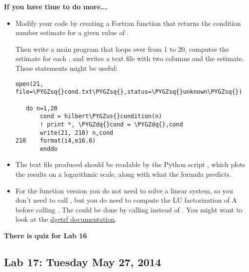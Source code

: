 \documentclass[letterpaper,10pt,english]{sphinxmanual}
\def\PYGZus{\char`\_}
\def\PYGZsq{\char`\'}
\def\PYGZdq{\char`\"}
\renewcommand\PYGZsq{\textquotesingle}
\begin{document}
\textbf{If you have time to do more...}
\begin{itemize}
\item {} 
Modify your code by creating a Fortran function  that returns the condition number
estimate for a given value of .

Then write a main program that loops over  from 1 to 20, computes the estimate for each ,
and writes a text file with two columns  and the estimate.  These statements might be
useful:

\begin{Verbatim}[commandchars=\\\{\}]
   open(21, file=\PYGZsq{}cond.txt\PYGZsq{},status=\PYGZsq{}unknown\PYGZsq{})

   do n=1,20
       cond = hilbert\PYGZus{}condition(n)
       ! print *, \PYGZdq{}cond = \PYGZdq{},cond
       write(21, 210) n,cond
210    format(i4,e16.6)
       enddo
\end{Verbatim}

\item {} 
The text file produced should be readable by the Python script
, which plots the results on a logarithmic scale, along with
what the formula predicts.

\item {} 
For the function version you do not need to solve a linear system, so you don't need to call
, but you do need to compute the LU factorization of A before calling .
The could be done by calling  instead of .
You might want to look at the \href{http://www.netlib.no/netlib/lapack/double/dgetrf.f}{dgetrf documentation}.

\end{itemize}

\textbf{There is quiz for Lab 16}


\subsection{Lab 17: Tuesday May 27, 2014}
\label{labs/lab17:lab17}\label{labs/lab17:lab-17-tuesday-may-27-2014}\label{labs/lab17::doc}
\end{document}
